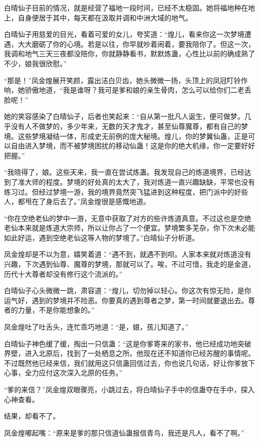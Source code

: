 \begin{this_body}
白晴仙子目前的情况，就是经营了福地一段时间，已经不太稳固。她将福地种在地上，自身便居于其中，每天都在汲取并调和中洲大域的地气。

白晴仙子用慈爱的目光，看着可爱的女儿，夸奖道：“煌儿，看来你这一次梦境遭遇，大大磨砺了你的心境。若是以往，你早就吵着闹着，要我陪你了。但这一次，我调和地气三天三夜都没陪你，你就静静看书，默默炼蛊，心性比以前的确成熟了不少，娘我很欣慰。”

“那是！”凤金煌展开笑颜，露出洁白贝齿，她头微微一扬，头顶上的凤冠叮铃作响，她骄傲地道，“我是谁呀？我可是爹和娘的亲生骨肉，怎么可以给你们二老丢脸呢！”

她的笑容感染了白晴仙子，后者也笑起来：“自从第一批凡人诞生，便可做梦。几乎没有人不做梦的，多少年来，无数的天才鬼才，甚至仙尊魔尊，都有自己的梦境。这些梦境凝结一体，形成史无前例的庞大秘境。煌儿，你的梦翼仙蛊，正是可以自由进入梦境，而不被梦境困扰的移动仙蛊！这是你的绝大机缘，你一定要好好把握。”

“我晓得了，娘。这些天来，我一直在尝试炼蛊。我发现自己的炼道境界，已经达到了准大师的程度。梦境的好处真的太大了，我对炼道一直兴趣缺缺，平常也没有练习过。但经过梦境一游，我的境界竟然突飞猛进到这种程度，把门派中的好些人，都甩在了身后去了。”凤金煌很是感慨地道。

“你在空绝老仙的梦中一游，无意中获取了对方的些许炼道真意。不过这也是空绝老仙本来就是炼道大宗师，所以让你占了一个便宜。梦境繁多芜杂，你下次未必能如此好运，遇到空绝老仙这等人物的梦境了。”白晴仙子分析道。

凤金煌却是不以为意，嬉笑着道：“遇不到，就遇不到呗。人家本来就对炼道没有兴趣，下次遇到仙尊、魔尊的梦境，那就可以了。唉，不过可惜，我走的是金道，历代十大尊者却没有修行这个流派的。”

白晴仙子心头微微一跳，肃容道：“煌儿，切勿掉以轻心。你这次有惊无险，是你运气好，遇到的梦境并不险恶。你要真的遇到尊者之梦，第一时间就要退出去。尊者的力量，不是你能想象的。”

凤金煌吐了吐舌头，连忙乖巧地道：“是，娘，孩儿知道了。”

白晴仙子神色缓了缓，掏出一只信蛊：“这是你爹寄来的家书，他已经成功地突破界壁，进入北原后，找到了一处栖息之所。他现在还不知道你已经苏醒的事情呢。不过既然他已经来信，我们就用这只信蛊回信过去，你也说几句话，好让你爹放下心事，全力应付这次深入北原的任务。”

“爹的来信？”凤金煌双眼骤亮，小跳过去，将白晴仙子手中的信蛊夺在手中，探入心神查看。

结果，却看不了。

凤金煌嘟起嘴：“原来是爹的那只信道仙蛊报信青鸟，我还是凡人，看不了啊。”


\end{this_body}
